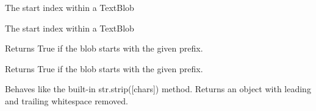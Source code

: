 \documentclass[letterpaper,10pt,english]{sphinxmanual}
\begin{document}
\begin{fulllineitems}
\begin{fulllineitems}
\begin{quote}
\begin{description}
\end{description}\end{quote}

\end{fulllineitems}


\begin{fulllineitems}
\label{api_reference:textblob_de.blob.Sentence.start}
The start index within a TextBlob

\end{fulllineitems}


\begin{fulllineitems}
\label{api_reference:textblob_de.blob.Sentence.start_index}
The start index within a TextBlob

\end{fulllineitems}


\begin{fulllineitems}
\label{api_reference:textblob_de.blob.Sentence.starts_with}
Returns True if the blob starts with the given prefix.

\end{fulllineitems}


\begin{fulllineitems}
\label{api_reference:textblob_de.blob.Sentence.startswith}
Returns True if the blob starts with the given prefix.

\end{fulllineitems}


\begin{fulllineitems}
\label{api_reference:textblob_de.blob.Sentence.strip}
Behaves like the built-in str.strip({[}chars{]}) method. Returns
an object with leading and trailing whitespace removed.


\end{fulllineitems}
\end{fulllineitems}
\end{document}
